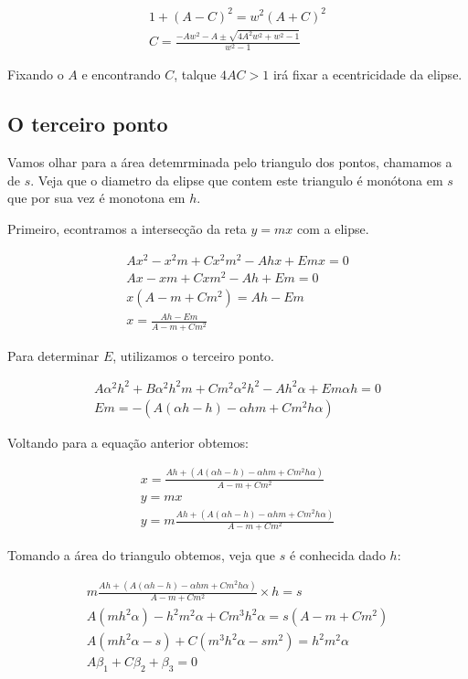 \documentclass{article}
\begin{document}
	\begin{align*}
	1 + (A-C)^2 = w^2(A+C)^2\\
	C = \frac{-Aw^2 - A \pm \sqrt{4A^2w^2 + w^2 -1}}{w^2 - 1}
	\end{align*}
	
	Fixando o $A$ e encontrando $C$, talque $4AC > 1$ irá fixar a ecentricidade da elipse.
	
	\subsection{O terceiro ponto}
	
	Vamos olhar para a área detemrminada pelo triangulo dos pontos, chamamos a de $s$. Veja que o diametro da elipse que contem este triangulo é monótona em $s$ que por sua vez é monotona em $h$.
	
	Primeiro, econtramos a intersecção da reta $y=mx$ com a elipse.
	
	\begin{align*}
	Ax^2 -x^2m + Cx^2m^2 -Ahx + Emx = 0\\
	Ax -xm + Cxm^2 -Ah + Em = 0\\
	x(A-m + Cm^2) = Ah - Em\\
	x = \frac{Ah-Em}{A-m + Cm^2}
	\end{align*}
	
	Para determinar $E$, utilizamos o terceiro ponto.
	
	\begin{align*}
	A\alpha^2h^2 + B\alpha^2 h^2 m + Cm^2\alpha^2h^2 -Ah^2 \alpha + E m \alpha h = 0\\
	Em = -(	A(\alpha h - h) -\alpha hm + Cm^2h\alpha)
	\end{align*}
	
	Voltando para a equação anterior obtemos:
	
	\begin{align*}
	x = \frac{Ah+(	A(\alpha h - h) -\alpha hm + Cm^2h\alpha)}{A-m + Cm^2}\\
	y = mx\\
	y = m\frac{Ah+(	A(\alpha h - h) -\alpha hm + Cm^2h\alpha)}{A-m + Cm^2}
	\end{align*}
	
	Tomando a área do triangulo obtemos, veja que $s$ é conhecida dado $h$:
	
	\begin{align*}
	m\frac{Ah+(	A(\alpha h - h) -\alpha hm + Cm^2h\alpha)}{A-m + Cm^2} \times h = s\\
	A(mh^2\alpha) - h^2m^2\alpha + Cm^3h^2\alpha = s(A-m+Cm^2)\\
	A(mh^2\alpha -s) + C(m^3h^2\alpha -sm^2) = h^2m^2\alpha\\
	A\beta_1 + C\beta_2 + \beta_3 = 0
	\end{align*}
\end{document}
